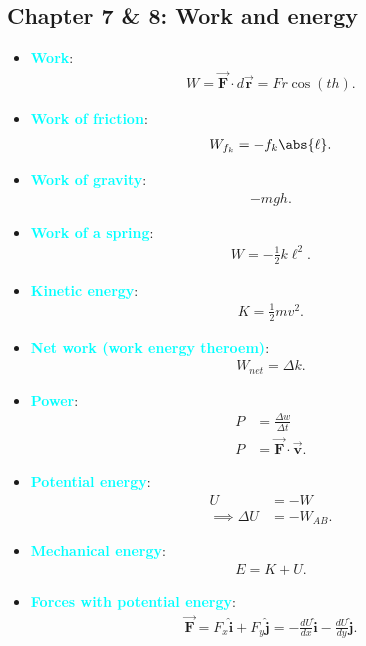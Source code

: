 \documentclass{report}
\begin{document}
    \subsection{Chapter 7 \& 8: Work and energy}
    \begin{itemize}
        \item \textbf{\textcolor{cyan}{Work}}:
            \begin{align*}
                W = \vec{\mathbf{F}} \cdot d\vec{\mathbf{r}} = Fr\cos{\left(th\right)}
            .\end{align*}
        \item \textbf{\textcolor{cyan}{Work of friction}}:
            \begin{align*}
                W_{f_{k}} = -f_{k}\abs{\ell}
            .\end{align*}
        \item \textbf{\textcolor{cyan}{Work of gravity}}:
            \begin{align*}
                -mgh
            .\end{align*}
        \item \textbf{\textcolor{cyan}{Work of a spring}}:
            \begin{align*}
                W = -\frac{1}{2}k\ell^{2}
            .\end{align*}
        \item \textbf{\textcolor{cyan}{Kinetic energy}}:
            \begin{align*}
                K = \frac{1}{2}mv^{2}
            .\end{align*}
        \item \textbf{\textcolor{cyan}{Net work (work energy theroem)}}:
            \begin{align*}
                W_{net} = \Delta k
            .\end{align*}
        \item \textbf{\textcolor{cyan}{Power}}:
            \begin{align*}
                P &= \frac{\Delta w}{\Delta t} \\
                P &= \vec{\mathbf{F}} \cdot \vec{\mathbf{v}}
            .\end{align*}
        \item \textbf{\textcolor{cyan}{Potential energy}}:
            \begin{align*}
                U &= -W \\
                \implies  \Delta U &= -W_{AB}
            .\end{align*}
        \item \textbf{\textcolor{cyan}{Mechanical energy}}:
            \begin{align*}
                E = K + U
            .\end{align*}
        \item \textbf{\textcolor{cyan}{Forces with potential energy}}:
            \begin{align*}
                \vec{\mathbf{F}} = F_{x}\hat{\mathbf{i}} + F_{y}\hat{\mathbf{j}} = -\frac{dU}{dx}\hat{\mathbf{i}} - \frac{dU}{dy}\hat{\mathbf{j}}
            .\end{align*}
    \end{itemize}
\end{document}
